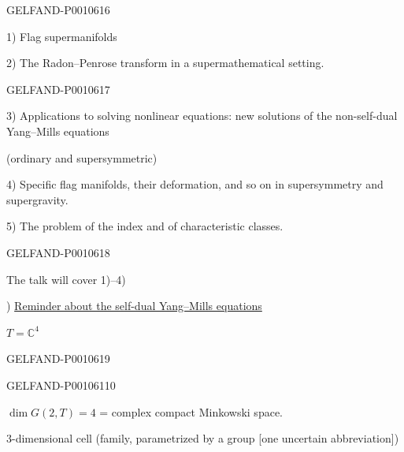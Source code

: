 \begin{GelfandAdjacentEvidence}{GELFAND-P001061}{6}



1) Flag supermanifolds

2) The Radon–Penrose transform in a supermathematical setting.
\end{GelfandAdjacentEvidence}
\begin{GelfandAdjacentEvidence}{GELFAND-P001061}{7}


3) Applications to solving nonlinear equations: new solutions of the non-self-dual Yang–Mills equations

(ordinary and supersymmetric)

4) Specific flag manifolds, their deformation, and so on in supersymmetry and supergravity.

5) The problem of the index and of characteristic classes.
\end{GelfandAdjacentEvidence}
\begin{GelfandAdjacentEvidence}{GELFAND-P001061}{8}


The talk will cover 1)–4)

) \underline{Reminder about the self-dual Yang–Mills equations}

\(T=\mathbb C^4\)
\end{GelfandAdjacentEvidence}
\begin{GelfandAdjacentEvidence}{GELFAND-P001061}{9}

\end{GelfandAdjacentEvidence}
\begin{GelfandAdjacentEvidence}{GELFAND-P001061}{10}


\(\dim G(2,T)=4\) = complex compact Minkowski space.

3-dimensional cell (family, parametrized by a group [one uncertain abbreviation])
\end{GelfandAdjacentEvidence}
